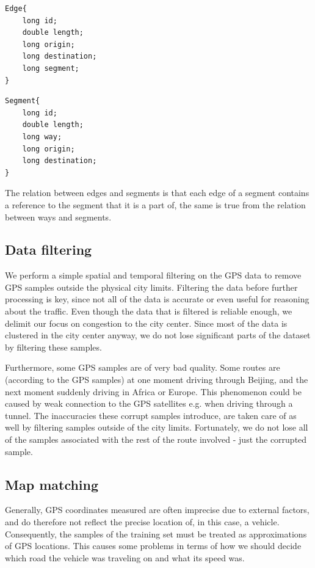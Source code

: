 \begin{lstlisting}[style=java, caption=Datastructure for an edge, label=lst:edge]
Edge{
	long id;
	double length;
	long origin;
	long destination;
	long segment;
}
\end{lstlisting}

\begin{lstlisting}[style=java, caption=Datastructure for a segment, label=lst:segment]
Segment{
	long id;
	double length;
	long way;
	long origin;
	long destination;
}
\end{lstlisting}

The relation between edges and segments is that each edge of a segment contains a reference to the segment that it is a part of, the same is true from the relation between ways and segments.

\subsection{Data filtering}\label{sec:datafiltering}
We perform a simple spatial and temporal filtering on the GPS data to remove GPS samples outside the physical city limits. Filtering the data before further processing is key, since not all of the data is accurate or even useful for reasoning about the traffic. Even though the data that is filtered is reliable enough, we delimit our focus on congestion to the city center. Since most of the data is clustered in the city center anyway, we do not lose significant parts of the dataset by filtering these samples.

Furthermore, some GPS samples are of very bad quality. Some routes are (according to the GPS samples) at one moment driving through Beijing, and the next moment suddenly driving in Africa or Europe. This phenomenon could be caused by weak connection to the GPS satellites e.g. when driving through a tunnel. The inaccuracies these corrupt samples introduce, are taken care of as well by filtering samples outside of the city limits. Fortunately, we do not lose all of the samples associated with the rest of the route involved - just the corrupted sample.

\subsection{Map matching}\label{sec:mapmatching}
Generally, GPS coordinates measured are often imprecise due to external factors, and do therefore not reflect the precise location of, in this case, a vehicle. Consequently, the samples of the training set must be treated as approximations of GPS locations. This causes some problems in terms of how we should decide which road the vehicle was traveling on and what its speed was.

